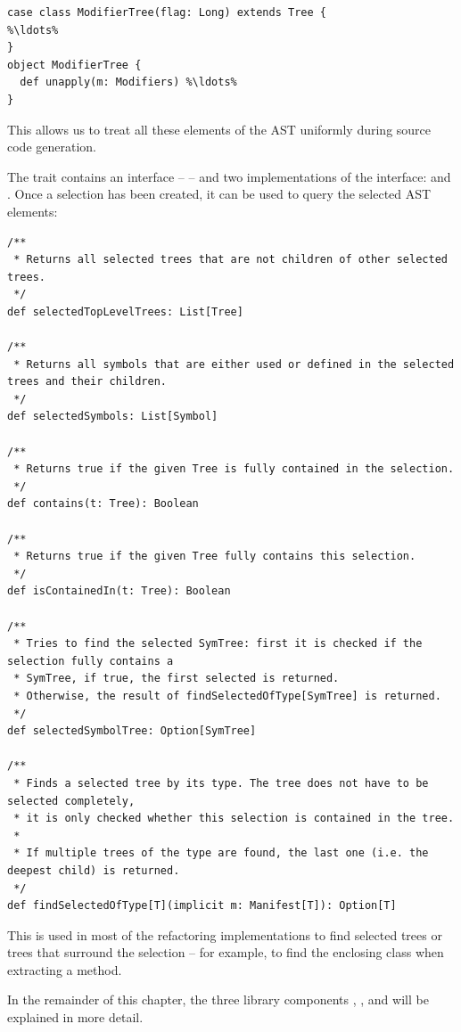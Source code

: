 \begin{lstlisting}
case class ModifierTree(flag: Long) extends Tree {
%\ldots%
}
object ModifierTree {
  def unapply(m: Modifiers) %\ldots%
}
\end{lstlisting}

This allows us to treat all these elements of the AST uniformly during source code generation.

The  trait contains an interface --  -- and two implementations of the interface:  and . Once a selection has been created, it can be used to query the selected AST elements:

\begin{lstlisting}
/**
 * Returns all selected trees that are not children of other selected trees.
 */
def selectedTopLevelTrees: List[Tree]
    
/**
 * Returns all symbols that are either used or defined in the selected trees and their children.
 */
def selectedSymbols: List[Symbol]

/**
 * Returns true if the given Tree is fully contained in the selection.
 */
def contains(t: Tree): Boolean

/**
 * Returns true if the given Tree fully contains this selection.
 */
def isContainedIn(t: Tree): Boolean

/**
 * Tries to find the selected SymTree: first it is checked if the selection fully contains a
 * SymTree, if true, the first selected is returned. 
 * Otherwise, the result of findSelectedOfType[SymTree] is returned.
 */
def selectedSymbolTree: Option[SymTree]

/**
 * Finds a selected tree by its type. The tree does not have to be selected completely,
 * it is only checked whether this selection is contained in the tree.
 * 
 * If multiple trees of the type are found, the last one (i.e. the deepest child) is returned.
 */
def findSelectedOfType[T](implicit m: Manifest[T]): Option[T]
\end{lstlisting}

This is used in most of the refactoring implementations to find selected trees or trees that surround the selection -- for example, to find the enclosing class when extracting a method.

In the remainder of this chapter, the three library components , , and  will be explained in more detail. 

